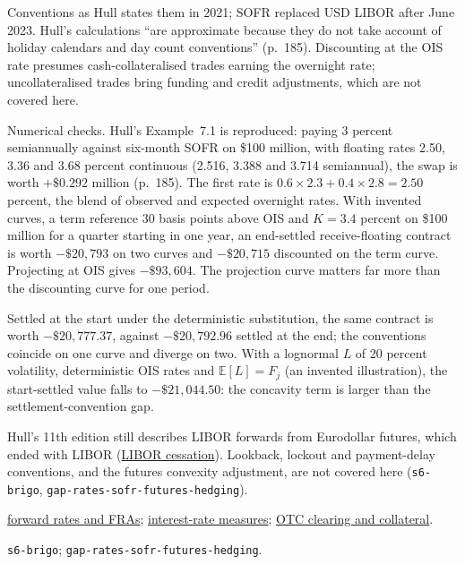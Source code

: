 \begin{qfmodel}
 Conventions as Hull states them in 2021; SOFR replaced USD LIBOR after June 2023. Hull's calculations ``are approximate because they do not take account of holiday calendars and day count conventions'' (p.~185). Discounting at the OIS rate presumes cash-collateralised trades earning the overnight rate; uncollateralised trades bring funding and credit adjustments, which are not covered here.

 Numerical checks. Hull's Example~7.1 is reproduced: paying 3 percent semiannually against six-month SOFR on \$100 million, with floating rates 2.50, 3.36 and 3.68 percent continuous (2.516, 3.388 and 3.714 semiannual), the swap is worth $+\$0.292$ million (p.~185). The first rate is $0.6\times2.3+0.4\times2.8=2.50$ percent, the blend of observed and expected overnight rates. With invented curves, a term reference 30 basis points above OIS and $K=3.4$ percent on \$100 million for a quarter starting in one year, an end-settled receive-floating contract is worth $-\$20{,}793$ on two curves and $-\$20{,}715$ discounted on the term curve. Projecting at OIS gives $-\$93{,}604$. The projection curve matters far more than the discounting curve for one period.

Settled at the start under the deterministic substitution, the same contract is worth $-\$20{,}777.37$, against $-\$20{,}792.96$ settled at the end; the conventions coincide on one curve and diverge on two. With a lognormal $L$ of 20 percent volatility, deterministic OIS rates and $\mathbb{E}[L]=F_j$ (an invented illustration), the start-settled value falls to $-\$21{,}044.50$: the concavity term is larger than the settlement-convention gap.

 Hull's 11th edition still describes LIBOR forwards from Eurodollar futures, which ended with LIBOR (\hyperref[meth:policy-path-ois-futures]{LIBOR cessation}). Lookback, lockout and payment-delay conventions, and the futures convexity adjustment, are not covered here (\nolinkurl{s6-brigo}, \nolinkurl{gap-rates-sofr-futures-hedging}).

 \hyperref[mod:forward-rates-fra]{forward rates and FRAs}; \hyperref[def:interest-rate-measures]{interest-rate measures}; \hyperref[mech:otc-clearing-collateral]{OTC clearing and collateral}.

 \nolinkurl{s6-brigo}; \nolinkurl{gap-rates-sofr-futures-hedging}.

\end{qfmodel}

